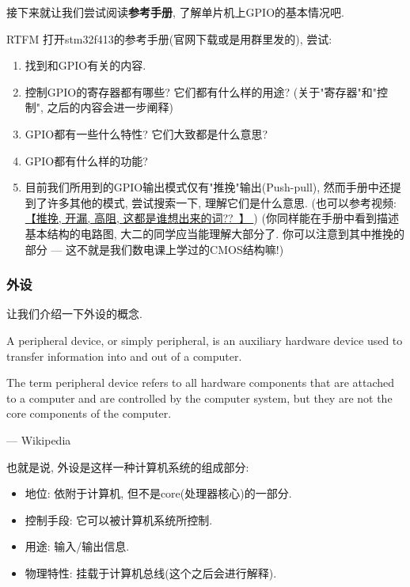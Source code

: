 接下来就让我们尝试阅读\textbf{参考手册}, 了解单片机上GPIO的基本情况吧.

\begin{theorem}{RTFM}
	打开stm32f413的参考手册(官网下载或是用群里发的), 尝试:
	\begin{enumerate}
		\item 找到和GPIO有关的内容.
		\item 控制GPIO的寄存器都有哪些? 它们都有什么样的用途? (关于"寄存器"和"控制", 之后的内容会进一步阐释)
		\item GPIO都有一些什么特性? 它们大致都是什么意思?
		\item GPIO都有什么样的功能?
		\item 目前我们所用到的GPIO输出模式仅有"推挽"输出(Push-pull), 然而手册中还提到了许多其他的模式, 尝试搜索一下, 理解它们是什么意思. (也可以参考视频: \href{https://www.bilibili.com/video/BV1D84y1c7GV/?share_source=copy_web&vd_source=b25682b699c98b1c6e3947c9b7b66a3a}{【推挽, 开漏, 高阻, 这都是谁想出来的词??\ 】 }) (你同样能在手册中看到描述基本结构的电路图, 大二的同学应当能理解大部分了. 你可以注意到其中推挽的部分 --- 这不就是我们数电课上学过的CMOS结构嘛!)
	\end{enumerate}
\end{theorem}

\subsubsection{外设}
让我们介绍一下外设的概念.
\begin{definition}
	A peripheral device, or simply peripheral, is an auxiliary hardware device used to transfer information into and out of a computer.

	The term peripheral device refers to all hardware components that are attached to a computer and are controlled by the computer system, but they are not the core components of the computer.

	--- Wikipedia
\end{definition}

也就是说, 外设是这样一种计算机系统的组成部分:
\begin{itemize}
	\item 地位: 依附于计算机, 但不是core(处理器核心)的一部分.
	\item 控制手段: 它可以被计算机系统所控制.
	\item 用途: 输入/输出信息.
	\item 物理特性: 挂载于计算机总线(这个之后会进行解释).
\end{itemize}

